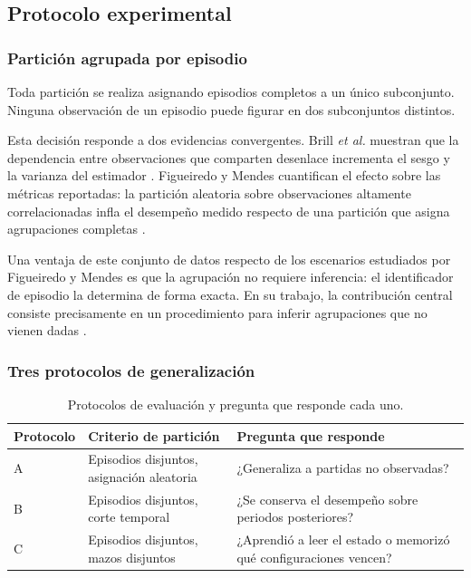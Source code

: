 \subsection{Protocolo experimental}
\label{subsec:protocolo}

\subsubsection{Partición agrupada por episodio}

Toda partición se realiza asignando episodios completos a un único
subconjunto. Ninguna observación de un episodio puede figurar en dos
subconjuntos distintos.

Esta decisión responde a dos evidencias convergentes. Brill \textit{et al.}
muestran que la dependencia entre observaciones que comparten desenlace
incrementa el sesgo y la varianza del estimador
\cite{brill_winprob_2026}. Figueiredo y Mendes cuantifican el efecto sobre
las métricas reportadas: la partición aleatoria sobre observaciones
altamente correlacionadas infla el desempeño medido respecto de una
partición que asigna agrupaciones completas
\cite{figueiredo_leakage_2024}.


Una ventaja de este conjunto de datos respecto de los escenarios estudiados
por Figueiredo y Mendes es que la agrupación no requiere inferencia: el
identificador de episodio la determina de forma exacta. En su trabajo, la
contribución central consiste precisamente en un procedimiento para inferir
agrupaciones que no vienen dadas \cite{figueiredo_leakage_2024}.

\subsubsection{Tres protocolos de generalización}

\begin{table}[!t]
\centering
\caption{Protocolos de evaluación y pregunta que responde cada uno.}
\label{tab:protocolos}
\footnotesize
\begin{tabularx}{\columnwidth}{@{}P{1.5cm} P{2.3cm} Y@{}}
\toprule
\textbf{Protocolo} & \textbf{Criterio de partición} &
\textbf{Pregunta que responde}\\
\midrule
A & Episodios disjuntos, asignación aleatoria &
¿Generaliza a partidas no observadas?\\
B & Episodios disjuntos, corte temporal &
¿Se conserva el desempeño sobre periodos posteriores?\\
C & Episodios disjuntos, mazos disjuntos &
¿Aprendió a leer el estado o memorizó qué configuraciones vencen?\\
\bottomrule
\end{tabularx}
\end{table}

